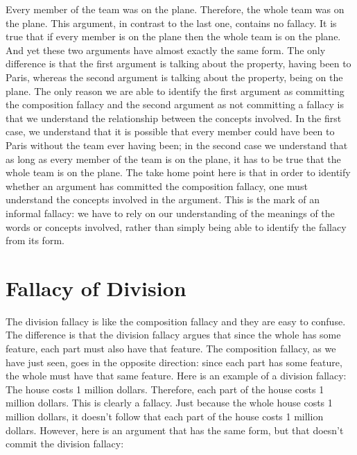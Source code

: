 Every member of the team was on the plane. Therefore, the whole team
was on the plane.
This argument, in contrast to the last one, contains no fallacy. It is true that if
every member is on the plane then the whole team is on the plane. And yet
these two arguments have almost exactly the same form. The only difference is
that the first argument is talking about the property, having been to Paris,
whereas the second argument is talking about the property, being on the plane.
The only reason we are able to identify the first argument as committing the
composition fallacy and the second argument as not committing a fallacy is that
we understand the relationship between the concepts involved. In the first case,
we understand that it is possible that every member could have been to Paris
without the team ever having been; in the second case we understand that as
long as every member of the team is on the plane, it has to be true that the
whole team is on the plane. The take home point here is that in order to identify
whether an argument has committed the composition fallacy, one must
understand the concepts involved in the argument. This is the mark of an
informal fallacy: we have to rely on our understanding of the meanings of the
words or concepts involved, rather than simply being able to identify the fallacy
from its form.

\section{Fallacy of Division}
The division fallacy is like the composition fallacy and they are easy to confuse.
The difference is that the division fallacy argues that since the whole has some
feature, each part must also have that feature. The composition fallacy, as we
have just seen, goes in the opposite direction: since each part has some feature,
the whole must have that same feature. Here is an example of a division fallacy:
The house costs 1 million dollars. Therefore, each part of the house costs
1 million dollars.
This is clearly a fallacy. Just because the whole house costs 1 million dollars, it
doesn't follow that each part of the house costs 1 million dollars. However, here
is an argument that has the same form, but that doesn't commit the division
fallacy:


